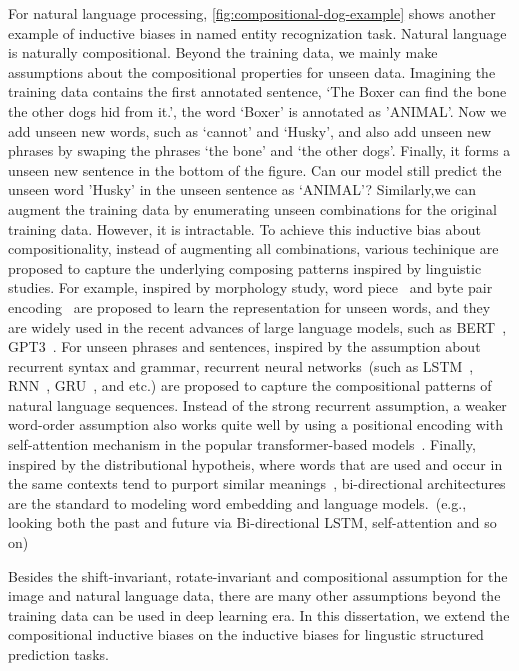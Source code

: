  For natural
language processing, \autoref{fig:compositional-dog-example} shows
another example of inductive biases in named entity recognization
task. Natural language is naturally compositional. Beyond the training
data, we mainly make assumptions about the compositional properties
for unseen data. Imagining the training data contains the first
annotated sentence, `The Boxer can find the bone the other dogs hid
from it.', the word `Boxer' is annotated as 'ANIMAL'. Now we add
unseen new words, such as `cannot' and `Husky', and also add unseen
new phrases by swaping the phrases `the bone' and `the other
dogs'. Finally, it forms a unseen new sentence in the bottom of the
figure. Can our model still predict the unseen word 'Husky' in the
unseen sentence as `ANIMAL'? Similarly,we can augment the training
data by enumerating unseen combinations for the original training
data. However, it is intractable. To achieve this inductive bias about
compositionality, instead of augmenting all combinations, various
techinique are proposed to capture the underlying composing patterns
inspired by linguistic studies. For example, inspired by morphology
study, word piece~\citep{schuster2012japanese} and byte pair
encoding~\citep[BPE,][]{sennrich2016neural} are proposed to learn the
representation for unseen words, and they are widely used in the
recent advances of large language models, such as
BERT~\citep{devlin2019bert}, GPT3~\citep{brown2020language}. For
unseen phrases and sentences, inspired by the assumption about
recurrent syntax and grammar, recurrent neural networks~(such as
LSTM~\citep{hochreiter97lstm}, RNN~\citep{mesnil13rnn},
GRU~\citep{chung14gru}, and etc.)  are proposed to capture the
compositional patterns of natural language sequences. Instead of the
strong recurrent assumption, a weaker word-order assumption also works
quite well by using a positional encoding with self-attention
mechanism in the popular transformer-based
models~\citep{NIPS2017_7181}. Finally, inspired by the distributional
hypotheis, where words that are used and occur in the same contexts
tend to purport similar meanings~\cite{harris1954distributional},
bi-directional architectures are the standard to modeling word
embedding and language models.~(e.g., looking both the past and future
via Bi-directional LSTM, self-attention and so on)

Besides the shift-invariant, rotate-invariant and compositional
assumption for the  image and natural language data, there
are many other assumptions beyond the training data can be used in
deep learning era. In this dissertation, we extend the compositional
inductive biases on the inductive biases for lingustic structured
prediction tasks. %


